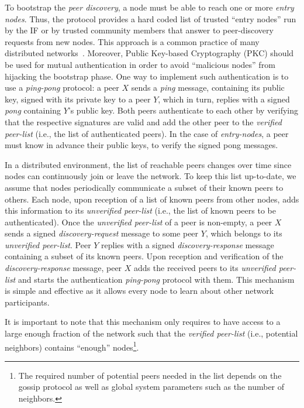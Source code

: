 \documentclass[../main.tex]{subfiles}
\begin{document}
To bootstrap the \emph{peer discovery}, a node must be able to reach one or more \emph{entry nodes}. 
%
Thus, the protocol provides a hard coded list of trusted \enquote{entry nodes} run by the IF or by trusted community members that answer to peer-discovery requests from new nodes. 
%
This approach is a common practice of many distributed networks~\cite{neudecker2018network}. 
%
Moreover, Public Key-based Cryptography (PKC) should be used for mutual authentication in order to avoid \enquote{malicious  nodes} from hijacking the bootstrap phase.
%
One way to implement such authentication is to use a \emph{ping-pong} protocol: a peer $X$ sends a \emph{ping} message, containing its public key, signed with its private key to a peer $Y$, which in turn, replies with a signed \emph{pong} containing $Y$'s public key. 
%
Both peers authenticate to each other by verifying that the respective signatures are valid and add the other peer to the \emph{verified peer-list} (i.e., the list of authenticated peers). 
%
In the case of \emph{entry-nodes}, a peer must know in advance their public keys, to verify the signed pong messages.
%

In a distributed environment, the list of reachable peers changes over time since nodes can continuously join or leave the network. 
%
To keep this list up-to-date, we assume that nodes periodically communicate a subset of their known peers to others. 
%
Each node, upon reception of a list of known peers from other nodes, adds this information to its \emph{unverified peer-list} (i.e., the list of known peers to be authenticated).
%
Once the \emph{unverified peer-list} of a peer is non-empty, a peer $X$ sends a signed \emph{discovery-request} message to some peer $Y$, which belongs to its \emph{unverified peer-list}.
%
Peer $Y$ replies with a signed \emph{discovery-response} message containing a subset of its known peers.
%
Upon reception and verification of the \emph{discovery-response} message, peer $X$ adds the received peers to its \emph{unverified peer-list} and starts the authentication \emph{ping-pong} protocol with them.
%
This mechanism is simple and effective as it allows every node to learn about other network participants. 
%

It is important to note that this mechanism only requires to have access to a large enough fraction of the network such that the \emph{verified peer-list} (i.e., potential neighbors) contains \enquote{enough} nodes\footnote{The required number of potential peers needed in the list depends on the gossip protocol as well as global system parameters such as the number of neighbors.}.
\end{document}

